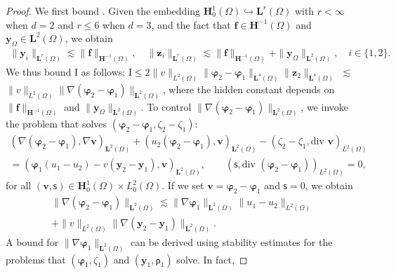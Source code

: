 \documentclass[final]{siamart0216}
\begin{document}
\begin{proof}
We first bound . Given the embedding $\mathbf{H}_0^1(\Omega) \hookrightarrow \mathbf{L}^{r}(\Omega)$ with $r<\infty$ when $d=2$ and $r\leq6$ when $d=3$, and the fact that $\mathbf{f} \in \mathbf{H}^{-1}(\Omega)$ and $\mathbf{y}_{\Omega}\in\mathbf{L}^2(\Omega)$, we obtain
\begin{align}\label{eq:estimates_extra}
\|\mathbf{y}_i\|_{\mathbf{L}^{r}(\Omega)}\lesssim \|\mathbf{f}\|_{\mathbf{H}^{-1}(\Omega)},
\quad 
\|\mathbf{z}_i\|_{\mathbf{L}^{r}(\Omega)}\lesssim \|\mathbf{f}\|_{\mathbf{H}^{-1}(\Omega)}+\|\mathbf{y}_{\Omega}\|_{\mathbf{L}^{2}(\Omega)},
\quad
i\in\{1,2\}.
\end{align}
We thus bound $\text{I}$ as follows: $\text{I} \leq 2 \|v\|_{L^2(\Omega)}\|\boldsymbol{\varphi}_2-\boldsymbol{\varphi}_1\|_{\mathbf{L}^4(\Omega)}\|\mathbf{z}_2\|_{\mathbf{L}^4(\Omega)}$ $\lesssim$ $\|v\|_{L^2(\Omega)}\|\nabla(\boldsymbol{\varphi}_2-\boldsymbol{\varphi}_1)\|_{\mathbf{L}^2(\Omega)}$, where the hidden constant depends on $\|\mathbf{f}\|_{\mathbf{H}^{-1}(\Omega)}$ and $\|\mathbf{y}_\Omega\|_{\mathbf{L}^2(\Omega)}$. To control $\|\nabla(\boldsymbol{\varphi}_2-\boldsymbol{\varphi}_1)\|_{\mathbf{L}^2(\Omega)}$, we invoke the problem that solves $(\boldsymbol{\varphi}_2-\boldsymbol{\varphi}_1,\zeta_2-\zeta_1)$:
\begin{multline*}
(\nabla (\boldsymbol{\varphi}_2-\boldsymbol{\varphi}_1),\nabla \mathbf{v})_{\mathbf{L}^2(\Omega)}+( u_2(\boldsymbol{\varphi}_2-\boldsymbol{\varphi}_1), \mathbf{v})_{\mathbf{L}^2(\Omega)}-(\zeta_2-\zeta_1,\text{div }\mathbf{v})_{L^2(\Omega)} \\= (\boldsymbol{\varphi}_1(u_1-u_2)-v(\mathbf{y}_2-\mathbf{y}_1),\mathbf{v})_{\mathbf{L}^2(\Omega)},\qquad
(\mathsf{s},\text{div }(\boldsymbol{\varphi}_2-\boldsymbol{\varphi}_1))_{L^2(\Omega)}  =  0,
\end{multline*}
for all $(\mathbf{v},\mathsf{s}) \in \mathbf{H}_0^1(\Omega) \times L_0^2(\Omega)$. If we set $\mathbf{v}=\boldsymbol{\varphi}_2-\boldsymbol{\varphi}_1$ and $\mathsf{s}=0$, we obtain
\begin{multline}\label{eq:estimate_aux1_theorem_second}
\|\nabla (\boldsymbol{\varphi}_2-\boldsymbol{\varphi}_1)\|_{\mathbf{L}^2(\Omega)}\lesssim \|\nabla\boldsymbol{\varphi}_1\|_{\mathbf{L}^{2}(\Omega)}\|u_1-u_2\|_{L^2(\Omega)}\\+\|v\|_{L^2(\Omega)}\|\nabla(\mathbf{y}_2-\mathbf{y}_1)\|_{\mathbf{L}^{2}(\Omega)}.
\end{multline}
A bound for $\|\nabla\boldsymbol{\varphi}_1\|_{\mathbf{L}^{2}(\Omega)}$ can be derived using stability estimates for the problems that $(\boldsymbol{\varphi}_1,\zeta_1)$ and $(\mathbf{y}_1,\mathsf{p}_1)$ solve. In fact,

\end{proof}
\end{document}
